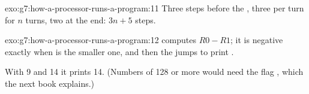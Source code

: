 \begin{solution}{exo:g7:how-a-processor-runs-a-program:11}
Three steps before the , three per turn for $n$ turns, two at the end:
$3n + 5$ steps.

\label{lst:g7:how-a-processor-runs-a-program:sum-steps}

\label{out:g7:how-a-processor-runs-a-program:sum-steps}
\end{solution}

\begin{solution}{exo:g7:how-a-processor-runs-a-program:12}
 computes $R0 - R1$; it is negative exactly when 
is the smaller one, and then the  jumps to print .

\label{lst:g7:how-a-processor-runs-a-program:sol-larger}

With 9 and 14 it prints 14. (Numbers of 128 or more would need the flag
, which the next book explains.)
\end{solution}

